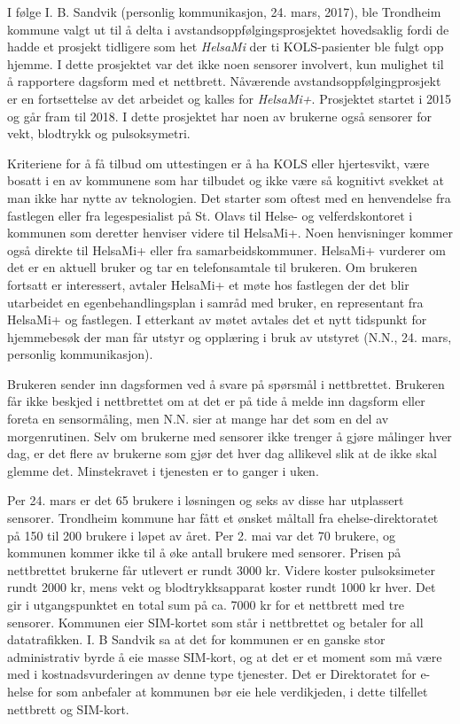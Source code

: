 I følge I. B. Sandvik (personlig kommunikasjon, 24. mars, 2017), ble Trondheim kommune valgt ut til å delta i avstandsoppfølgingsprosjektet hovedsaklig fordi de hadde et
prosjekt tidligere som het \textit{HelsaMi} der ti KOLS-pasienter ble fulgt opp hjemme. I dette prosjektet var det ikke noen sensorer involvert,
kun mulighet til å rapportere dagsform med et nettbrett. Nåværende avstandsoppfølgingprosjekt er en fortsettelse av det arbeidet
og kalles for \textit{HelsaMi+}. Prosjektet startet i 2015 og går fram til 2018. I dette prosjektet har noen av brukerne også sensorer
for vekt, blodtrykk og pulsoksymetri.

Kriteriene for å få tilbud om uttestingen er å ha KOLS eller hjertesvikt, være bosatt i en av kommunene som har tilbudet og ikke være så kognitivt
svekket at man ikke har nytte av teknologien. Det starter som oftest med en henvendelse fra fastlegen eller fra legespesialist på St. Olavs
til Helse- og velferdskontoret i kommunen som deretter
henviser videre til HelsaMi+. Noen henvisninger kommer også direkte til HelsaMi+ eller fra samarbeidskommuner. HelsaMi+ vurderer om det er en aktuell
bruker og tar en telefonsamtale til brukeren. Om brukeren fortsatt er interessert, avtaler HelsaMi+ et møte hos fastlegen der det blir utarbeidet en
egenbehandlingsplan i samråd med bruker, en representant fra HelsaMi+ og fastlegen. I etterkant av møtet avtales det et nytt tidspunkt for
hjemmebesøk der man får utstyr og opplæring i bruk av utstyret (N.N., 24. mars, personlig kommunikasjon).

Brukeren sender inn dagsformen ved å svare på spørsmål i nettbrettet.  Brukeren får ikke beskjed i nettbrettet om at det er på tide å melde inn dagsform eller foreta en sensormåling, men N.N. 
sier at mange har det som en del av morgenrutinen. Selv om brukerne med sensorer ikke trenger å gjøre målinger hver dag, er det flere av brukerne
som gjør det hver dag allikevel slik at de ikke skal glemme det. Minstekravet i tjenesten er to ganger i uken.

Per 24. mars er det 65 brukere i løsningen og seks av disse har utplassert sensorer. Trondheim kommune har fått et ønsket måltall fra
ehelse-direktoratet på 150 til 200 brukere i løpet av året. Per 2. mai var det 70 brukere, og kommunen kommer ikke til å øke antall
brukere med sensorer.
Prisen på nettbrettet brukerne får utlevert er rundt 3000 kr. Videre koster
pulsoksimeter rundt 2000 kr, mens vekt og blodtrykksapparat koster rundt 1000 kr hver. Det gir i utgangspunktet en total sum på ca. 7000 kr
for et nettbrett med tre sensorer. Kommunen eier SIM-kortet som står i nettbrettet og betaler for all datatrafikken. I. B Sandvik sa at
det for kommunen er en ganske stor administrativ byrde å eie masse SIM-kort, og at det er et moment som må være med i kostnadsvurderingen
av denne type tjenester. Det er Direktoratet for e-helse for som anbefaler at kommunen bør eie hele verdikjeden, i dette tilfellet nettbrett
og SIM-kort.

